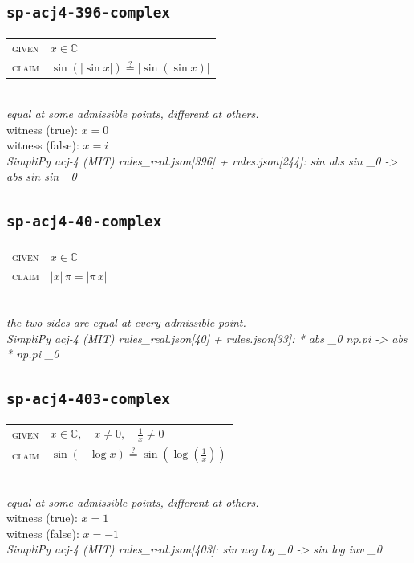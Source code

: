 \documentclass[11pt]{article}
\begin{document}
\subsection*{\texttt{sp-acj4-396-complex}}
\begin{tabular}{@{}l@{\quad}l@{}}
\textsc{given} & $x \in \mathbb{C}$ \\[4pt]
\textsc{claim} & $\displaystyle \sin\left(\left|\sin x\right|\right) \overset{?}{=} \left|\sin\left(\sin x\right)\right|$ \\
\end{tabular}\\[2pt]
{\small\emph{equal at some admissible points, different at others.}}\\
{\footnotesize\color{gray}witness (true): $x = 0$}\\
{\footnotesize\color{gray}witness (false): $x = i$}\\
\emph{SimpliPy acj-4 (MIT) rules\_real.json[396] + rules.json[244]: sin abs sin \_0  ->  abs sin sin \_0}\\

\subsection*{\texttt{sp-acj4-40-complex}}
\begin{tabular}{@{}l@{\quad}l@{}}
\textsc{given} & $x \in \mathbb{C}$ \\[4pt]
\textsc{claim} & $\displaystyle \left|x\right| \, \pi = \left|\pi \, x\right|$ \\
\end{tabular}\\[2pt]
{\small\emph{the two sides are equal at every admissible point.}}\\
\emph{SimpliPy acj-4 (MIT) rules\_real.json[40] + rules.json[33]: * abs \_0 np.pi  ->  abs * np.pi \_0}\\

\subsection*{\texttt{sp-acj4-403-complex}}
\begin{tabular}{@{}l@{\quad}l@{}}
\textsc{given} & $x \in \mathbb{C},\quad x \neq 0,\quad \frac{1}{x} \neq 0$ \\[4pt]
\textsc{claim} & $\displaystyle \sin\left(-\log x\right) \overset{?}{=} \sin\left(\log\left(\frac{1}{x}\right)\right)$ \\
\end{tabular}\\[2pt]
{\small\emph{equal at some admissible points, different at others.}}\\
{\footnotesize\color{gray}witness (true): $x = 1$}\\
{\footnotesize\color{gray}witness (false): $x = -1$}\\
\emph{SimpliPy acj-4 (MIT) rules\_real.json[403]: sin neg log \_0  ->  sin log inv \_0}\\
\end{document}
